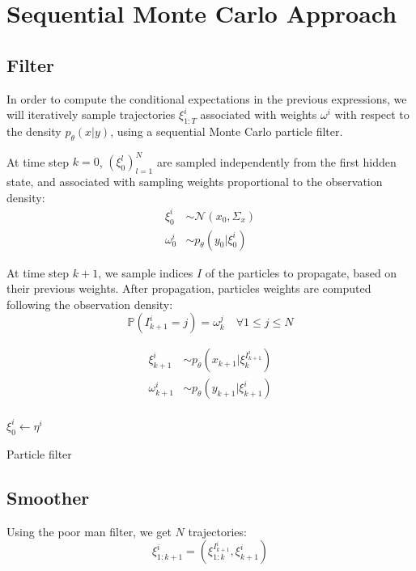 \documentclass[10pt,a4paper]{report}
\begin{document}
\section{Sequential Monte Carlo Approach}
\label{sec:smc}

\subsection{Filter}
In order to compute the conditional expectations in the previous expressions, we will iteratively sample trajectories $\xi_{1:T}^i$ associated with weights $\omega^i$ with respect to the density $p_\theta(x | y)$, using a sequential Monte Carlo particle filter.

At time step $k=0$, $(\xi_0^l)_{l=1}^N$ are sampled independently from the first hidden state, and associated with sampling weights proportional to the observation density:
\begin{align*}
        \xi_0^i    & \sim \mathcal{N}(x_0, \Sigma_x) \\
        \omega_0^i & \sim p_\theta(y_0|\xi_0^i)
\end{align*}

At time step $k+1$, we sample indices $I$ of the particles to propagate, based on their previous weights.
After propagation, particles weights are computed following the observation density:
$$\mathbb{P}(I_{k+1}^i=j) = \omega_k^j \quad \forall 1 \leq j \leq N$$

\begin{align*}
        \xi_{k+1}^i    & \sim p_\theta(x_{k+1}|\xi_k^{I_{k+1}^i}) \\
        \omega_{k+1}^i & \sim p_\theta(y_{k+1}|\xi_{k+1}^i)       \\
\end{align*}

\begin{algorithm}
        $\xi_0^i \gets \eta^i$\;
        \caption{Particle filter}
\end{algorithm}

\subsection{Smoother}
Using the poor man filter, we get $N$ trajectories:
$$\xi_{1:k+1}^{i} = (\xi_{1:k}^{I_{k+1}^i}, \xi_{k+1}^i)$$
\end{document}
